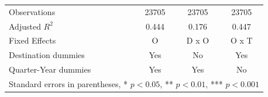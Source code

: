 \documentclass[compress, xcolor = {table,xcdraw}]{beamer}
\begin{document}
\begin{frame}
\begin{table}
\begin{tabular}{l*{3}{c}}
		\hline
		Observations        &       23705         &       23705         &       23705         \\
		Adjusted \(R^{2}\)  &       0.444         &       0.176         &       0.447         \\
		Fixed Effects       &           O         &       D x O         &       O x T         \\
		Destination dummies &         Yes         &          No         &         Yes         \\
		Quarter-Year dummies&         Yes         &         Yes         &          No         \\
		\hline\hline
		\multicolumn{4}{l}{\tiny Standard errors in parentheses, * \(p<0.05\), ** \(p<0.01\), *** \(p<0.001\)}\\
	\end{tabular}
\end{table}
\end{frame}
\end{document}
